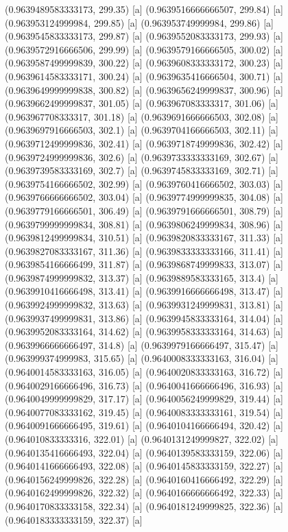 {{{(0.9639489583333173, 299.35) [a] 
(0.9639516666666507, 299.84) [a] 
(0.963953124999984, 299.85) [a] 
(0.963953749999984, 299.86) [a] 
(0.9639545833333173, 299.87) [a] 
(0.9639552083333173, 299.93) [a] 
(0.9639572916666506, 299.99) [a] 
(0.9639579166666505, 300.02) [a] 
(0.9639587499999839, 300.22) [a] 
(0.9639608333333172, 300.23) [a] 
(0.9639614583333171, 300.24) [a] 
(0.9639635416666504, 300.71) [a] 
(0.9639649999999838, 300.82) [a] 
(0.9639656249999837, 300.96) [a] 
(0.9639662499999837, 301.05) [a] 
(0.963967083333317, 301.06) [a] 
(0.963967708333317, 301.18) [a] 
(0.9639691666666503, 302.08) [a] 
(0.9639697916666503, 302.1) [a] 
(0.9639704166666503, 302.11) [a] 
(0.9639712499999836, 302.41) [a] 
(0.9639718749999836, 302.42) [a] 
(0.9639724999999836, 302.6) [a] 
(0.9639733333333169, 302.67) [a] 
(0.9639739583333169, 302.7) [a] 
(0.9639745833333169, 302.71) [a] 
(0.9639754166666502, 302.99) [a] 
(0.9639760416666502, 303.03) [a] 
(0.9639766666666502, 303.04) [a] 
(0.9639774999999835, 304.08) [a] 
(0.9639779166666501, 306.49) [a] 
(0.9639791666666501, 308.79) [a] 
(0.9639799999999834, 308.81) [a] 
(0.9639806249999834, 308.96) [a] 
(0.9639812499999834, 310.51) [a] 
(0.9639820833333167, 311.33) [a] 
(0.9639827083333167, 311.36) [a] 
(0.9639833333333166, 311.41) [a] 
(0.9639854166666499, 311.87) [a] 
(0.9639868749999833, 313.07) [a] 
(0.9639874999999832, 313.37) [a] 
(0.9639889583333165, 313.4) [a] 
(0.9639910416666498, 313.41) [a] 
(0.9639916666666498, 313.47) [a] 
(0.9639924999999832, 313.63) [a] 
(0.9639931249999831, 313.81) [a] 
(0.9639937499999831, 313.86) [a] 
(0.9639945833333164, 314.04) [a] 
(0.9639952083333164, 314.62) [a] 
(0.9639958333333164, 314.63) [a] 
(0.9639966666666497, 314.8) [a] 
(0.9639979166666497, 315.47) [a] 
(0.963999374999983, 315.65) [a] 
(0.9640008333333163, 316.04) [a] 
(0.9640014583333163, 316.05) [a] 
(0.9640020833333163, 316.72) [a] 
(0.9640029166666496, 316.73) [a] 
(0.9640041666666496, 316.93) [a] 
(0.9640049999999829, 317.17) [a] 
(0.9640056249999829, 319.44) [a] 
(0.9640077083333162, 319.45) [a] 
(0.9640083333333161, 319.54) [a] 
(0.9640091666666495, 319.61) [a] 
(0.9640104166666494, 320.42) [a] 
(0.964010833333316, 322.01) [a] 
(0.9640131249999827, 322.02) [a] 
(0.9640135416666493, 322.04) [a] 
(0.9640139583333159, 322.06) [a] 
(0.9640141666666493, 322.08) [a] 
(0.9640145833333159, 322.27) [a] 
(0.9640156249999826, 322.28) [a] 
(0.9640160416666492, 322.29) [a] 
(0.9640162499999826, 322.32) [a] 
(0.9640166666666492, 322.33) [a] 
(0.9640170833333158, 322.34) [a] 
(0.9640181249999825, 322.36) [a] 
(0.9640183333333159, 322.37) [a] 
}}}
